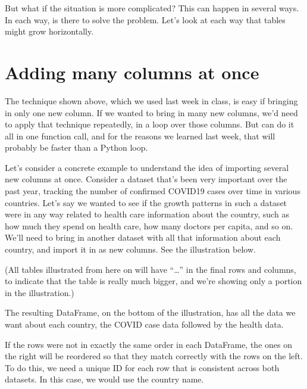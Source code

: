 \documentclass[letterpaper,10pt,english]{jupyterBook}
\begin{document}
\sphinxAtStartPar
But what if the situation is more complicated?  This can happen in several ways.  In each way,  is there to solve the problem.  Let’s look at each way that tables might grow horizontally.


\section{Adding many columns at once}
\label{\detokenize{chapter-12-concat-and-merge:adding-many-columns-at-once}}
\sphinxAtStartPar
The technique shown above, which we used last week in class, is easy if bringing in only one new column.  If we wanted to bring in many new columns, we’d need to apply that technique repeatedly, in a loop over those columns.  But  can do it all in one function call, and for the reasons we learned last week, that will probably be faster than a Python loop.

\sphinxAtStartPar
Let’s consider a concrete example to understand the idea of importing several new columns at once.  Consider a dataset that’s been very important over the past year, tracking the number of confirmed COVID\sphinxhyphen{}19 cases over time in various countries.  Let’s say we wanted to see if the growth patterns in such a dataset were in any way related to health care information about the country, such as how much they spend on health care, how many doctors per capita, and so on.  We’ll need to bring in another dataset with all that information about each country, and import it in as new columns.  See the illustration below.

\sphinxAtStartPar
(All tables illustrated from here on will have “…” in the final rows and columns, to indicate that the table is really much bigger, and we’re showing only a portion in the illustration.)

\sphinxAtStartPar
{}

\sphinxAtStartPar
The resulting DataFrame, on the bottom of the illustration, has all the data we want about each country, the COVID case data followed by the health data.

\sphinxAtStartPar
If the rows were not in exactly the same order in each DataFrame, the ones on the right will be reordered so that they match correctly with the rows on the left.  To do this, we need a unique ID for each row that is consistent across both datasets.  In this case, we would use the country name.
\end{document}
